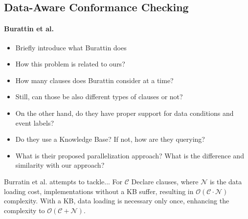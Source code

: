 \subsection{Data-Aware Conformance Checking}

\paragraph*{Burattin et al.} \cite{BurattinMS16}
\begin{itemize}
	\item{Briefly introduce what Burattin does}
	\item{How this problem is related to ours?}
	\item{How many clauses does Burattin consider at a time?}
	\item{Still, can those be also different types of clauses or not?}
	\item{On the other hand, do they have proper support for data conditions and event labels?}
	\item{Do they use a Knowledge Base? If not, how are they querying?}
	\item{What is their proposed parallelization approach? What is the difference and similarity with our approach?}
\end{itemize}
Burratin et al. attempts to tackle... For $\mathcal{C}$ Declare clauses, where $\mathcal{N}$ is the data loading cost, implementations without a KB suffer, resulting in $\mathcal{O(C \cdot N)}$ complexity. With a KB, data loading is necessary only once, enhancing the complexity to $\mathcal{O(C + N)}$.

